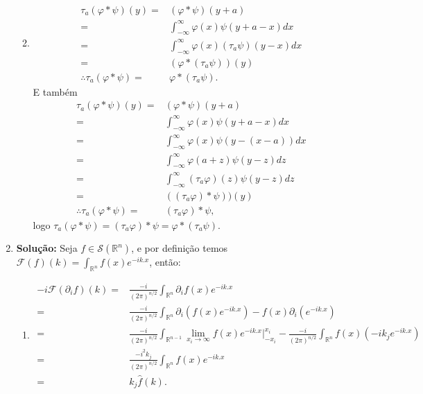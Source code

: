 \documentclass{article}
\begin{document}
\begin{enumerate}
\begin{enumerate}
\begin{enumerate}
					\end{enumerate}
				\item 
				$$
				\begin{aligned}
				\tau_{a}(\varphi*\psi)(y)= & (\varphi*\psi)(y+a) 
				\\
				= & \int_{-\infty}^{\infty}\varphi(x)\psi(y+a-x)dx
				\\
				= & \int_{-\infty}^{\infty}\varphi(x)(\tau_{a}\psi)(y-x)dx
				\\
				= & (\varphi*(\tau_{a}\psi))(y)
				\\
				\therefore \tau_{a}(\varphi*\psi) = & \varphi*(\tau_{a}\psi).
				\end{aligned}
				$$
				E também
				$$
				\begin{aligned}
				\tau_{a}(\varphi*\psi)(y)= & (\varphi*\psi)(y+a) 
				\\
				= & \int_{-\infty}^{\infty}\varphi(x)\psi(y+a-x)dx
				\\
				= & \int_{-\infty}^{\infty}\varphi(x)\psi(y-(x-a))dx
				\\
				= & \int_{-\infty}^{\infty}\varphi(a+z)\psi(y-z)dz
				\\
				= & \int_{-\infty}^{\infty} (\tau_{a}\varphi)(z)\psi(y-z)dz
				\\
				= & ((\tau_{a}\varphi)*\psi))(y)
				\\
				\therefore \tau_{a}(\varphi*\psi) = & (\tau_{a}\varphi)*\psi,
				\end{aligned}
				$$
				logo $\tau_{a}(\varphi*\psi) = (\tau_{a}\varphi)*\psi = \varphi*(\tau_{a}\psi)$.
			\end{enumerate}
		\item \textbf{Solução:} Seja $f \in \mathcal{S}(\mathbb{R}^{n})$, e por definição temos $\mathcal{F}(f)(k) = \int_{\mathbb{R}^{n}} f(x)e^{-ik.x}$, então:
			\begin{enumerate}
				\item 
				$$
				\begin{aligned}
				-i\mathcal{F}(\partial_{i}f)(k) = & \frac{-i}{(2\pi)^{n/2}}\int_{\mathbb{R}^{n}} \partial_{i}f(x)e^{-ik.x}
				\\
				= & \frac{-i}{(2\pi)^{n/2}}\int_{\mathbb{R}^{n}} \partial_{i}( f(x)e^{-ik.x} ) - f(x)\partial_{i}(e^{-ik.x})
				\\
				= & \frac{-i}{(2\pi)^{n/2}}\int_{\mathbb{R}^{n-1}} \lim_{x_{i} \to \infty} f(x)e^{-ik.x} \Big|^{x_{i}}_{-x_{i}} - \frac{-i}{(2\pi)^{n/2}}\int_{\mathbb{R}^{n}}  f(x) (-ik_{j}e^{-ik.x})
				\\
				= & \frac{-i^{2}k_{j}}{(2\pi)^{n/2}}\int_{\mathbb{R}^{n}}  f(x) e^{-ik.x}
				\\
				= & k_{j}\hat{f}(k).	
				\end{aligned}
				$$
				

\end{enumerate}
\end{enumerate}
\end{document}

